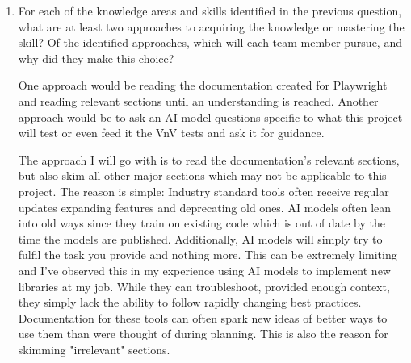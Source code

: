 \documentclass[12pt, titlepage]{article}
\begin{document}
\begin{enumerate}
  I will need to understand exactly how to use Playwright and enable browser testing,
  ensure accessibility tests are following the required standard that needs to be complied
  with.

  \item For each of the knowledge areas and skills identified in the previous
  question, what are at least two approaches to acquiring the knowledge or
  mastering the skill?  Of the identified approaches, which will each team
  member pursue, and why did they make this choice?

  One approach would be reading the documentation created for Playwright and
  reading relevant sections until an understanding is reached. Another approach
  would be to ask an AI model questions specific to what this project will test
  or even feed it the VnV tests and ask it for guidance.

  The approach I will go with is to read the documentation's relevant sections,
  but also skim all other major sections which may not be applicable to this project.
  The reason is simple: Industry standard tools often receive regular updates expanding
  features and deprecating old ones. AI models often lean into old ways
  since they train on existing code which is out of date by the time the models are published.
  Additionally, AI models will simply try to fulfil the task you provide and nothing more.
  This can be extremely limiting and I've observed this in my experience using AI models to
  implement new libraries at my job. While they can troubleshoot, provided enough context,
  they simply lack the ability to follow rapidly changing best practices.
  Documentation for these tools can often spark new ideas of better ways to use them than
  were thought of during planning. This is also the reason for skimming "irrelevant" sections.

\end{enumerate}
\end{document}

